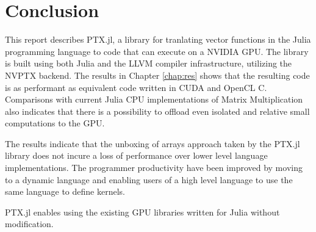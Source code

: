\chapter{Conclusion}
\begin{markdown}

This report describes PTX.jl, a library for tranlating vector
functions in the Julia programming language to code that can execute
on a NVIDIA GPU. The library is built using both Julia and the LLVM
compiler infrastructure, utilizing the NVPTX backend. The results in
Chapter \ref{chap:res} shows that the resulting code is as performant
as equivalent code written in CUDA and OpenCL C. Comparisons with
current Julia CPU implementations of Matrix Multiplication also
indicates that there is a possibility to offload even isolated and
relative small computations to the GPU.

The results indicate that the unboxing of arrays approach taken by the
PTX.jl library does not incure a loss of performance over lower level
language implementations. The programmer productivity have been
improved by moving to a dynamic language and enabling users of a high
level language to use the same language to define kernels. 

PTX.jl enables using the existing GPU libraries written for Julia
without modification.

\end{markdown}
